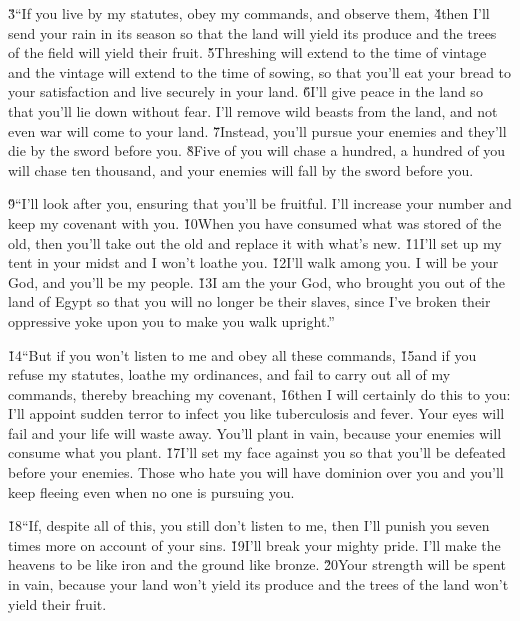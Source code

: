 \v{3}``If you live by my statutes, obey my commands, and observe them, \v{4}then I'll send your rain in its season so that the land will yield its produce and the trees of the field will yield their fruit. \v{5}Threshing will extend to the time of vintage and the vintage will extend to the time of sowing, so that you'll eat your bread to your satisfaction and live securely in your land. \v{6}I'll give peace in the land so that you'll lie down without fear. I'll remove wild beasts from the land, and not even war will come to your land. \v{7}Instead, you'll pursue your enemies and they'll die by the sword before you. \v{8}Five of you will chase a hundred, a hundred of you will chase ten thousand, and your enemies will fall by the sword before you.

\v{9}``I'll look after you, ensuring that you'll be fruitful. I'll increase your number and keep my covenant with you. \v{10}When you have consumed what was stored of the old, then you'll take out the old and replace it with what's new. \v{11}I'll set up my tent in your midst and I won't loathe you. \v{12}I'll walk among you. I will be your God, and you'll be my people. \v{13}I am the  your God, who brought you out of the land of Egypt so that you will no longer be their slaves, since I've broken their oppressive yoke upon you to make you walk upright.''

\v{14}``But if you won't listen to me and obey all these commands, \v{15}and if you refuse my statutes, loathe my ordinances, and fail to carry out all of my commands, thereby breaching my covenant, \v{16}then I will certainly do this to you: I'll appoint sudden terror to infect you like tuberculosis and fever. Your eyes will fail and your life will waste away. You'll plant in vain, because your enemies will consume what you plant. \v{17}I'll set my face against you so that you'll be defeated before your enemies. Those who hate you will have dominion over you and you'll keep fleeing even when no one is pursuing you.

\v{18}``If, despite all of this, you still don't listen to me, then I'll punish you seven times more on account of your sins. \v{19}I'll break your mighty pride. I'll make the heavens to be like iron and the ground like bronze. \v{20}Your strength will be spent in vain, because your land won't yield its produce and the trees of the land won't yield their fruit.

